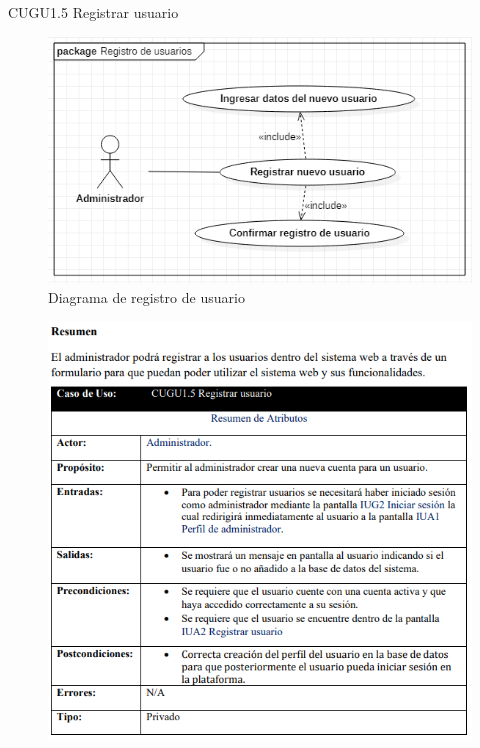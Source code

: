 \documentclass[12pt,letterpaper]{article}
\begin{document}
            \newpage
            CUGU1.5 Registrar usuario 
            \begin{figure}[H]
                \centering
                \includegraphics [scale=0.6]{casosUso/registrarUsuario}
                \caption{Diagrama de registro de usuario}
            \end{figure}
            \begin{figure}[H]
                \centering
                \includegraphics [scale=0.75]{specs/specRegistrarUsuario}
            \end{figure}
\end{document}
